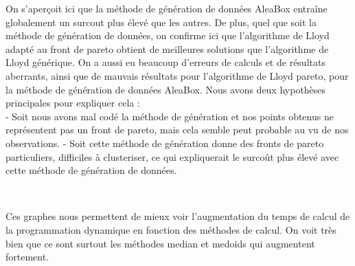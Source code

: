 ﻿\documentclass{meta}
\begin{document}
{On s'aperçoit ici que la méthode de génération de données AleaBox entraîne globalement un surcout plus élevé que les autres. De plus, quel que soit la méthode de génération de données, on confirme ici que l'algorithme de Lloyd adapté au front de pareto obtient de meilleures solutions que l'algorithme de Lloyd générique.
On a aussi eu beaucoup d'erreurs de calculs et de résultats aberrants, ainsi que de mauvais résultats pour l'algorithme de Lloyd pareto, pour la méthode de génération de données AleaBox. Nous avons deux hypothèses principales pour expliquer cela : \\
- Soit nous avons mal codé la méthode de génération et nos points obtenus ne représentent pas un front de pareto, mais cela semble peut probable au vu de nos observations.
- Soit cette méthode de génération donne des fronts de pareto particuliers, difficiles à clusteriser, ce qui expliquerait le surcoût plus élevé avec cette méthode de génération de données.

\begin{center}
\end{center}

\\

\begin{center}
\end{center}

Ces graphes nous permettent de mieux voir l'augmentation du temps de calcul de la programmation dynamique en fonction des méthodes de calcul. On voit très bien que ce sont surtout les méthodes median et medoids qui augmentent fortement.\\

}
\end{document}

